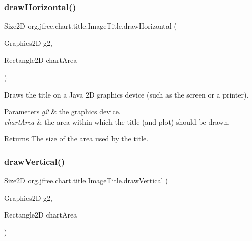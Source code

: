 \mbox{\label{classorg_1_1jfree_1_1chart_1_1title_1_1_image_title_a3ca1645a111e8135402cc2cdb933d929}} 
\subsubsection{\texorpdfstring{draw\+Horizontal()}{drawHorizontal()}}
{\footnotesize\ttfamily Size2D org.\+jfree.\+chart.\+title.\+Image\+Title.\+draw\+Horizontal (\begin{DoxyParamCaption}\item[{Graphics2D}]{g2,  }\item[{Rectangle2D}]{chart\+Area }\end{DoxyParamCaption})\hspace{0.3cm}{\ttfamily [protected]}}

Draws the title on a Java 2D graphics device (such as the screen or a printer).


\begin{DoxyParams}{Parameters}
{\em g2} & the graphics device. \\
\hline
{\em chart\+Area} & the area within which the title (and plot) should be drawn.\\
\hline
\end{DoxyParams}
\begin{DoxyReturn}{Returns}
The size of the area used by the title. 
\end{DoxyReturn}
\mbox{\label{classorg_1_1jfree_1_1chart_1_1title_1_1_image_title_affcbdeb7d1cf30323727a8d555f91b5f}} 
\subsubsection{\texorpdfstring{draw\+Vertical()}{drawVertical()}}
{\footnotesize\ttfamily Size2D org.\+jfree.\+chart.\+title.\+Image\+Title.\+draw\+Vertical (\begin{DoxyParamCaption}\item[{Graphics2D}]{g2,  }\item[{Rectangle2D}]{chart\+Area }\end{DoxyParamCaption})\hspace{0.3cm}{\ttfamily [protected]}}

